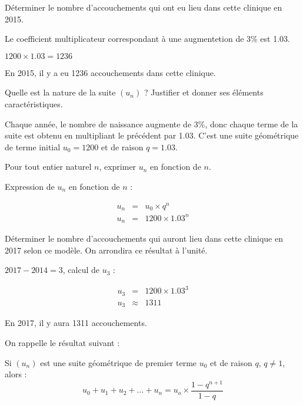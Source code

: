 \begin{questions}
	\question[\half] Déterminer le nombre d'accouchements  qui ont eu lieu dans cette clinique en 2015.
	\begin{solution}
		Le coefficient multiplicateur correspondant à une augmentetion de 3\% est \num{1.03}.
		
		$1200 \times \num{1.03} = 1236$
		
		En 2015, il y a eu \num{1236} accouchements dans cette clinique.
	\end{solution}
	\question[1] Quelle est la nature de la suite $(u_n)$ ? Justifier et donner ses éléments caractéristiques.
	\begin{solution}
		Chaque année, le nombre de naissance augmente de 3\%, donc chaque terme de la suite est obtenu en multipliant le précédent par \num{1.03}. C'est une suite géométrique de terme initial $u_0 = 1200$ et de raison $q=\num{1.03}$.
	\end{solution}
	\question[1] Pour tout entier naturel $n$, exprimer $u_n$ en fonction de $n$.
	\begin{solution}
		Expression de $u_n$ en fonction de $n$ :
		
		\begin{eqnarray*}
			u_n &=& u_0 \times q^n \\
			u_n &=& \num{1200} \times \num{1.03}^n 
		\end{eqnarray*}
	\end{solution}

	\question[\half] Déterminer le nombre d'accouchements qui auront lieu dans cette clinique en 2017 selon ce modèle. On arrondira ce résultat à l'unité.
	\begin{solution}
		$2017 - 2014 = 3$, calcul de $u_3$ :
		
		\begin{eqnarray*}
			u_3 &=& \num{1200} \times \num{1.03}^3 \\
			u_3 & \approx & \num{1311}
		\end{eqnarray*}
	
	En 2017, il y aura \num{1311} accouchements.
	\end{solution}
	\question[1] On rappelle le résultat suivant :
	
	Si $(u_n)$ est une suite géométrique de premier terme $u_0$ et de raison $q$, $q\neq1$, alors :
	\begin{equation*}
		u_0 + u_1 + u_2 + ... + u_n = u_o \times \dfrac{1-q^{n+1}}{1-q}
	\end{equation*}


\end{questions}
